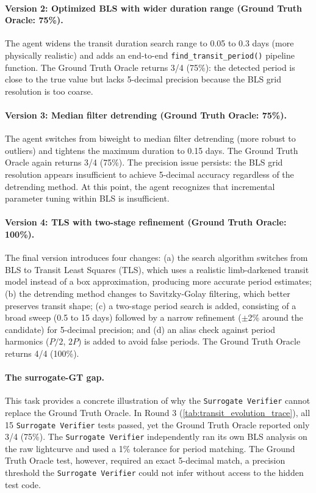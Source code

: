 \documentclass{article}
\begin{document}
\paragraph{Version 2: Optimized BLS with wider duration range (Ground Truth Oracle: 75\%).}
The agent widens the transit duration search range to 0.05 to 0.3 days (more physically realistic) and adds an end-to-end \texttt{find\_transit\_period()} pipeline function. The Ground Truth Oracle returns 3/4 (75\%): the detected period is close to the true value but lacks 5-decimal precision because the BLS grid resolution is too coarse.

\paragraph{Version 3: Median filter detrending (Ground Truth Oracle: 75\%).}
The agent switches from biweight to median filter detrending (more robust to outliers) and tightens the maximum duration to 0.15 days. The Ground Truth Oracle again returns 3/4 (75\%). The precision issue persists: the BLS grid resolution appears insufficient to achieve 5-decimal accuracy regardless of the detrending method. At this point, the agent recognizes that incremental parameter tuning within BLS is insufficient.

\paragraph{Version 4: TLS with two-stage refinement (Ground Truth Oracle: 100\%).}
The final version introduces four changes: (a) the search algorithm switches from BLS to Transit Least Squares (TLS), which uses a realistic limb-darkened transit model instead of a box approximation, producing more accurate period estimates; (b) the detrending method changes to Savitzky-Golay filtering, which better preserves transit shape; (c) a two-stage period search is added, consisting of a broad sweep (0.5 to 15 days) followed by a narrow refinement ($\pm$2\% around the candidate) for 5-decimal precision; and (d) an alias check against period harmonics ($P/2$, $2P$) is added to avoid false periods. The Ground Truth Oracle returns 4/4 (100\%).

\paragraph{The surrogate-GT gap.}
This task provides a concrete illustration of why the \texttt{Surrogate Verifier} cannot replace the Ground Truth Oracle. In Round 3 (\autoref{tab:transit_evolution_trace}), all 15 \texttt{Surrogate Verifier} tests passed, yet the Ground Truth Oracle reported only 3/4 (75\%). The \texttt{Surrogate Verifier} independently ran its own BLS analysis on the raw lightcurve and used a 1\% tolerance for period matching. The Ground Truth Oracle test, however, required an exact 5-decimal match, a precision threshold the \texttt{Surrogate Verifier} could not infer without access to the hidden test code.
\end{document}
